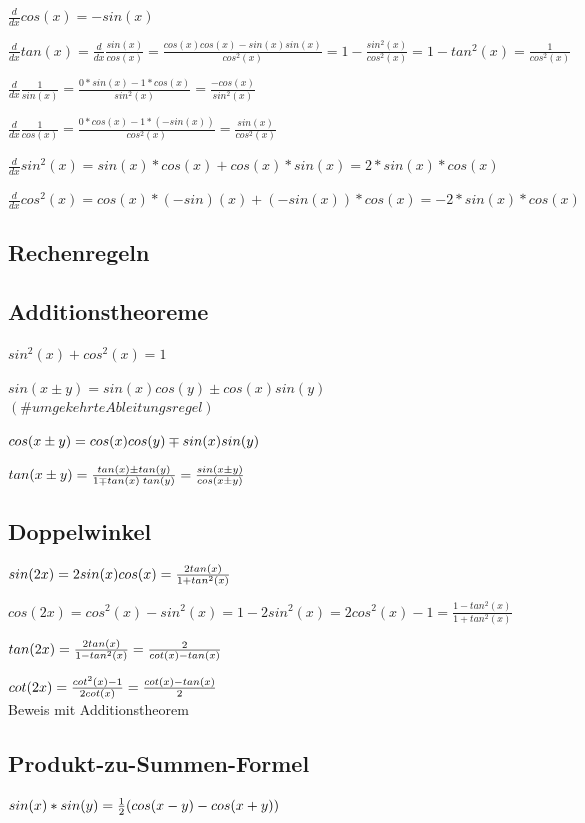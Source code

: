 $\frac{d}{dx}cos(x) = -sin(x)$

$\frac{d}{dx}tan(x) = \frac{d}{dx} \frac{sin(x)}{cos(x)} = \frac{cos(x)cos(x)- sin(x)sin(x)}{cos^2(x)} = 1 - \frac{sin^2(x)}{cos^2(x)} = 1 - tan^2(x) = \frac{1}{cos^2(x)}$

$\frac{d}{dx} \frac{1}{sin(x)} = \frac{0*sin(x) - 1*cos(x)}{sin^2(x)} = \frac{-cos(x)}{sin^2(x)}$ 

$\frac{d}{dx} \frac{1}{cos(x)} = \frac{0*cos(x) - 1*(-sin(x))}{cos^2(x)} = \frac{sin(x)}{cos^2(x)}$

$\frac{d}{dx}sin^2(x) = sin(x)*cos(x)+ cos(x)*sin(x) = 2*sin(x)*cos(x)$

$\frac{d}{dx}cos^2(x) = cos(x)*(-sin)(x)+ (-sin(x))*cos(x) = -2*sin(x)*cos(x)$ 

\subsection{Rechenregeln}
\subsection{Additionstheoreme}
$sin^2(x)+cos^2(x) = 1$

$sin(x \pm y) = sin(x)cos(y) \pm cos(x)sin(y)$    \ \ $(\# umgekehrteAbleitungsregel)$

$cos(x \pm y) = cos(x)cos(y) \mp sin(x) sin(y)$

$tan(x \pm y) = \frac{tan(x) \pm tan(y)}{ 1 \mp tan(x) \; tan(y) } = \frac{ sin(x \pm y) }{cos(x \pm y) }$

\subsection{Doppelwinkel}
$sin(2x)= 2sin(x) cos(x) = \frac{2 tan(x)}{ 1 + tan^2(x) }$

$cos(2x)= cos^2(x) - sin^2(x) = 1 - 2sin^2(x) = 2cos^2(x) - 1 = \frac{ 1 - tan^2(x) }{ 1 + tan^2(x) }$

$tan(2x)= \frac{ 2 tan(x) }{ 1 - tan^2(x) } = \frac{2}{ cot(x) - tan(x) }$

$cot(2x)= \frac{ cot^2(x) - 1}{2cot(x)} = \frac{cot(x) - tan(x)}{2}$ \\

Beweis mit Additionstheorem



\subsection{Produkt-zu-Summen-Formel}
$sin(x)*sin(y) = \frac{1}{2}(cos(x-y)-cos(x+y))$

